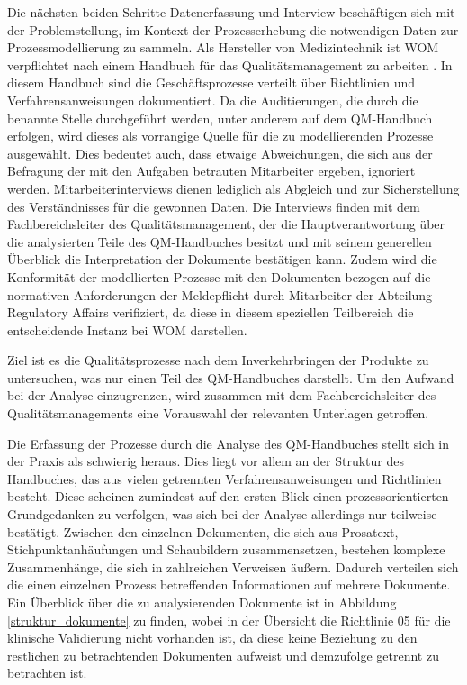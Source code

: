 \documentclass[a4paper,12pt]{report}
\begin{document}
Die nächsten beiden Schritte Datenerfassung und Interview beschäftigen sich mit der Problemstellung, im Kontext der Prozesserhebung die notwendigen Daten zur Prozessmodellierung zu sammeln. Als Hersteller von Medizintechnik ist WOM verpflichtet nach einem Handbuch für das Qualitätsmanagement zu arbeiten \citep[vgl.][S. 51ff.]{Ramakrishna2015}. In diesem Handbuch sind die Geschäftsprozesse verteilt über Richtlinien und Verfahrensanweisungen dokumentiert. Da die Auditierungen, die durch die benannte Stelle durchgeführt werden, unter anderem auf dem QM-Handbuch erfolgen, wird dieses als vorrangige Quelle für die zu modellierenden Prozesse ausgewählt. Dies bedeutet auch, dass etwaige Abweichungen, die sich aus der Befragung der mit den Aufgaben betrauten Mitarbeiter ergeben, ignoriert werden. Mitarbeiterinterviews dienen lediglich als Abgleich und zur Sicherstellung des Verständnisses für die gewonnen Daten. Die Interviews finden mit dem Fachbereichsleiter des Qualitätsmanagement, der die Hauptverantwortung über die analysierten Teile des QM-Handbuches besitzt und mit seinem generellen Überblick die Interpretation der Dokumente bestätigen kann. Zudem wird die Konformität der modellierten Prozesse mit den Dokumenten bezogen auf die normativen Anforderungen der Meldepflicht durch Mitarbeiter der Abteilung Regulatory Affairs verifiziert, da diese in diesem speziellen Teilbereich die entscheidende Instanz bei WOM darstellen.

Ziel ist es die Qualitätsprozesse nach dem Inverkehrbringen der Produkte zu untersuchen, was nur einen Teil des QM-Handbuches darstellt. Um den Aufwand bei der Analyse einzugrenzen, wird zusammen mit dem Fachbereichsleiter des Qualitätsmanagements eine Vorauswahl der relevanten Unterlagen getroffen.

Die Erfassung der Prozesse durch die Analyse des QM-Handbuches stellt sich in der Praxis als schwierig heraus. Dies liegt vor allem an der Struktur des Handbuches, das aus vielen getrennten Verfahrensanweisungen und Richtlinien besteht. Diese scheinen zumindest auf den ersten Blick einen prozessorientierten Grundgedanken zu verfolgen, was sich bei der Analyse allerdings nur teilweise bestätigt. Zwischen den einzelnen Dokumenten, die sich aus Prosatext, Stichpunktanhäufungen und Schaubildern zusammensetzen, bestehen komplexe Zusammenhänge, die sich in zahlreichen Verweisen äußern. Dadurch verteilen sich die einen einzelnen Prozess betreffenden Informationen auf mehrere Dokumente. Ein Überblick über die zu analysierenden Dokumente ist in Abbildung \ref{struktur_dokumente} zu finden, wobei in der Übersicht die Richtlinie 05 für die klinische Validierung nicht vorhanden ist, da diese keine Beziehung zu den restlichen zu betrachtenden Dokumenten aufweist und demzufolge getrennt zu betrachten ist.
\end{document}
